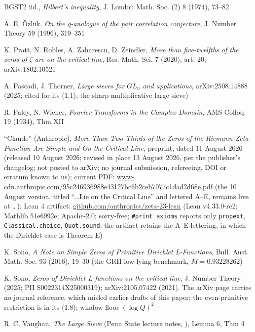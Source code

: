 \documentclass[11pt]{amsart}
\theoremstyle{plain}
\theoremstyle{remark}
\begin{document}
\begin{thebibliography}{BGST2}
 iid., \emph{Hilbert's inequality}, J. London Math. Soc. (2) 8
(1974), 73--82

 A. E. \"Ozl\"uk, \emph{On the q-analogue of the pair correlation
conjecture}, J. Number Theory 59 (1996), 319--351

 K. Pratt, N. Robles, A. Zaharescu, D. Zeindler, \emph{More than
five-twelfths of the zeros of $\zeta$ are on the critical line}, Res. Math. Sci. 7
(2020), art. 20; arXiv:1802.10521

 A. Pascadi, J. Thorner, \emph{Large sieves for $GL_n$ and
applications}, arXiv:2508.14888 (2025; cited for its (1.1), the sharp multiplicative
large sieve)

 R. Paley, N. Wiener, \emph{Fourier Transforms in the Complex
Domain}, AMS Colloq. 19 (1934), Thm XII

 ``Claude'' (Anthropic), \emph{More Than Two Thirds of the Zeros of the
Riemann Zeta Function Are Simple and On the Critical Line}, preprint, dated 11 August
2026 (released 10 August 2026; revised in place 13 August 2026, per the publisher's
changelog; not posted to arXiv; no journal submission, refereeing, DOI or erratum
known to us); current PDF:
\url{www-cdn.anthropic.com/95c246936988e43127bc6b2ceb7077c1dad2d68e.pdf} (the
10 August version, titled ``\dots Lie on the Critical Line'' and lettered A--E,
remains live at \dots{}); Lean 4
artifact: \url{github.com/anthropics/zeta-23-lean} (Lean v4.33.0-rc2; Mathlib
51e6992e; Apache-2.0; sorry-free; \texttt{\#print axioms} reports only
\texttt{propext}, \texttt{Classical.choice}, \texttt{Quot.sound}; the artifact
retains the A--E lettering, in which the Dirichlet case is Theorem E)

 K. Sono, \emph{A Note on Simple Zeros of Primitive Dirichlet
L-Functions}, Bull. Aust. Math. Soc. 93 (2016), 19--30 (the GRH low-lying benchmark,
$M = 0.93228262$)

 K. Sono, \emph{Zeros of Dirichlet L-functions on the critical
line}, J. Number Theory (2025; PII S0022314X25000319); arXiv:2105.07422 (2021). The
arXiv page carries no journal reference, which misled earlier drafts of this paper;
the even-primitive restriction is in its (1.8); window floor $(\log Q)^{2}$

 R. C. Vaughan, \emph{The Large Sieve} (Penn State lecture notes,
), Lemma 6, Thm 4


\end{thebibliography}
\end{document}

